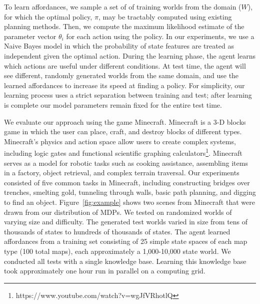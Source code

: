 To learn affordances, we sample a set of of training worlds from the
domain ($W$), for which the optimal policy, $\pi$, may be tractably
computed using existing planning methods. Then, we compute the maximum
likelihood estimate of the parameter vector $\theta_i$ for each action
using the policy. In our experiments, we use a Naive Bayes model
in which the probability of state features are treated as independent given
the optimal action.
During the learning phase, the agent learns which
actions are useful under different conditions. At test time, the agent
will see different, randomly generated worlds from the same domain,
and use the learned affordances to increase its speed at finding a
policy. 
For simplicity, our learning process uses a strict separation
between training and test; after learning is complete our model
parameters remain fixed for the entire test time. 

We evaluate our approach using the game Minecraft.  Minecraft is a 3-D
blocks game in which the user can place, craft, and destroy blocks of
different types.  Minecraft's physics and action space allow users to
create complex systems, including logic gates and functional
scientific graphing
calculators\footnote{https://www.youtube.com/watch?v=wgJfVRhotlQ}.
Minecraft serves as a model for robotic tasks such as cooking
assistance, assembling items in a factory, object retrieval, and
complex terrain traversal.
Our experiments consisted of five common tasks in
Minecraft, including constructing bridges over trenches, smelting
gold, tunneling through walls, basic path planning, and digging to
find an object. Figure~\ref{fig:example} shows two scenes
from Minecraft that were drawn from our distribution of MDPs.  
We tested on randomized worlds of varying size and
difficulty. The generated test worlds varied in size from tens of
thousands of states to hundreds of thousands of states.  The agent
learned affordances from a training set consisting of 25 simple state
spaces of each map type (100 total maps), each approximately a
1,000-10,000 state world. We conducted all tests with a single
knowledge base. Learning this knowledge base took approximately one
hour run in parallel on a computing grid.


